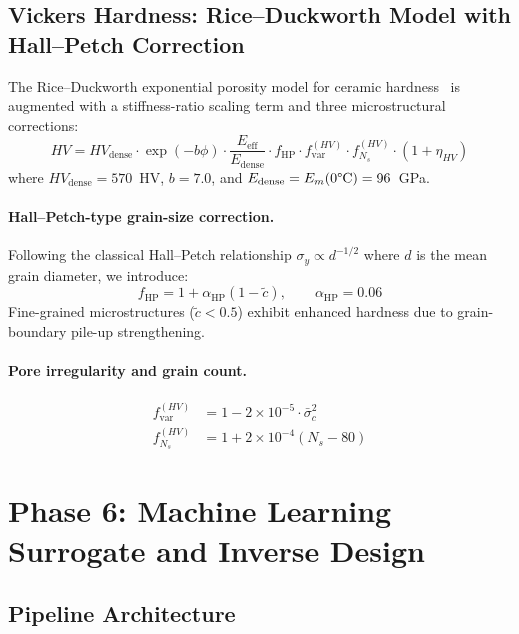 \documentclass[11pt,a4paper]{article}
\begin{document}
\subsection{Vickers Hardness: Rice--Duckworth Model with Hall--Petch Correction}

The Rice--Duckworth exponential porosity model for ceramic hardness~\cite{rice1998} is augmented with a stiffness-ratio scaling term and three microstructural corrections:
\begin{equation}
    HV = HV_{\text{dense}} \cdot \exp(-b\phi) \cdot \frac{E_{\text{eff}}}{E_{\text{dense}}} \cdot f_{\text{HP}} \cdot f_{\text{var}}^{(HV)} \cdot f_{N_s}^{(HV)} \cdot (1 + \eta_{HV})
    \label{eq:hardness}
\end{equation}
where $HV_{\text{dense}} = 570$~HV, $b = 7.0$, and $E_{\text{dense}} = E_m(0\text{\textdegree C}) = 96$~\si{GPa}.

\paragraph{Hall--Petch-type grain-size correction.}
Following the classical Hall--Petch relationship $\sigma_y \propto d^{-1/2}$ where $d$ is the mean grain diameter, we introduce:
\begin{equation}
    f_{\text{HP}} = 1 + \alpha_{\text{HP}}(1 - \tilde{c}), \qquad \alpha_{\text{HP}} = 0.06
\end{equation}
Fine-grained microstructures ($\tilde{c} < 0.5$) exhibit enhanced hardness due to grain-boundary pile-up strengthening.

\paragraph{Pore irregularity and grain count.}
\begin{align}
    f_{\text{var}}^{(HV)}  &= 1 - 2 \times 10^{-5} \cdot \bar{\sigma}^2_c \\
    f_{N_s}^{(HV)} &= 1 + 2 \times 10^{-4} (N_s - 80)
\end{align}

\section{Phase 6: Machine Learning Surrogate and Inverse Design}
\label{sec:phase6}

\subsection{Pipeline Architecture}
\end{document}
